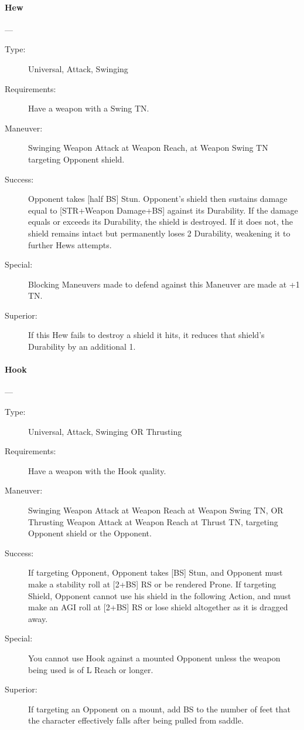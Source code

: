 \documentclass[oneside,11pt,english]{book}
\begin{document}
\paragraph{\large\label{man:Hew}Hew}---\quad{\large[0]}
\vspace{-10pt}\begin{description} 
\item [Type:] Universal, Attack, Swinging 
\item [Requirements:] Have a weapon with a Swing TN. 
\item [Maneuver:] Swinging Weapon Attack at Weapon Reach, at Weapon Swing TN targeting Opponent shield.
\item [Success:] Opponent takes [half BS] Stun. Opponent’s shield then sustains
  damage equal to [STR+Weapon Damage+BS] against its Durability. If the damage
  equals or exceeds its Durability, the shield is destroyed. If it does not, the
  shield remains intact but permanently loses 2 Durability, weakening it to
  further Hews attempts. 
\item [Special:] Blocking Maneuvers made to defend against this Maneuver are made at +1 TN. 
\item [Superior:] If this Hew fails to destroy a shield it hits, it reduces that shield’s Durability by an additional 1. 
\end{description}

\paragraph{\large\label{man:Hook}Hook}---\quad{\large[1]}
\vspace{-10pt}\begin{description} 
\item [Type:] Universal, Attack, Swinging OR Thrusting 
\item [Requirements:] Have a weapon with the Hook quality. 
\item [Maneuver:] Swinging Weapon Attack at Weapon Reach at Weapon Swing TN, OR Thrusting Weapon 
  Attack at Weapon Reach at Thrust TN, targeting Opponent shield or the Opponent. 
\item [Success:] If targeting Opponent, Opponent takes [BS] Stun, and Opponent must make a stability roll at 
  [2+BS] RS or be rendered Prone. 
  If targeting Shield, Opponent cannot use his shield in the following Action, and must make an AGI roll at 
  [2+BS] RS or lose shield altogether as it is dragged away. 
\item [Special:] You cannot use Hook against a mounted Opponent unless the weapon being used is of L Reach 
  or longer. 
\item [Superior:] If targeting an Opponent on a mount, add BS to the number of feet that the character 
  effectively falls after being pulled from saddle. 
\end{description}
\end{document}
